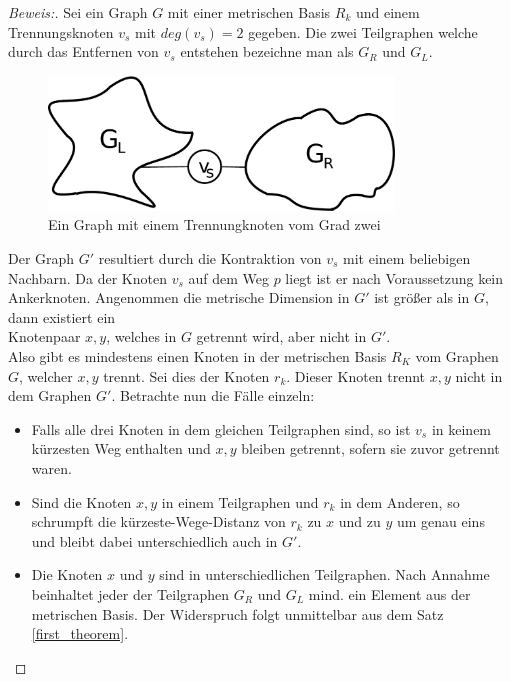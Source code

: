 \begin{proof}[Beweis:]
Sei ein Graph $G$ mit einer metrischen Basis $R_k$ und einem Trennungsknoten $v_s$ mit $deg(v_s)=2$ gegeben. Die zwei Teilgraphen welche durch das Entfernen von $v_s$ entstehen bezeichne man als $G_R$ und $G_L$.
\begin{figure}[ht]
\centering
\includegraphics*[width = 260pt]{bilder/proof4,2.pdf}
\caption{Ein Graph mit einem Trennungknoten vom Grad zwei}
\end{figure}
\newline Der Graph $G'$ resultiert durch die Kontraktion von $v_s$ mit einem beliebigen Nachbarn. Da der Knoten $v_s$ auf dem Weg $p$ liegt ist er nach Voraussetzung kein Ankerknoten.\newline
Angenommen die metrische Dimension in $G'$ ist größer als in $G$, dann existiert ein\\Knotenpaar $x,y$, welches in $G$ getrennt wird, aber nicht in $G'$.\\Also gibt es mindestens einen Knoten in der metrischen Basis $R_K$ vom Graphen $G$, welcher $x,y$ trennt. Sei dies der Knoten $r_k$. Dieser Knoten trennt $x,y$ nicht in dem Graphen $G'$. 
Betrachte nun die Fälle einzeln:
\begin{itemize}
\item Falls alle drei Knoten in dem gleichen Teilgraphen sind, so ist $v_s$ in keinem kürzesten Weg enthalten und $x,y$ bleiben getrennt, sofern sie zuvor getrennt waren.
\item Sind die Knoten $x,y$ in einem Teilgraphen und $r_k$ in dem Anderen, so schrumpft die kürzeste-Wege-Distanz von $r_k$ zu $x$ und zu $y$ um genau eins und bleibt dabei unterschiedlich auch in $G'$.
\item Die Knoten $x$ und $y$ sind in unterschiedlichen Teilgraphen. Nach Annahme beinhaltet jeder der Teilgraphen $G_R$ und $G_L$ mind. ein Element aus der metrischen Basis. Der Widerspruch folgt unmittelbar aus dem Satz \ref{first_theorem}.
\end{itemize}
\end{proof}
